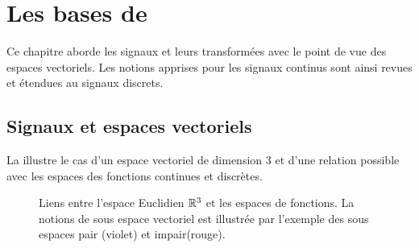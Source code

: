 \chapter{Les bases de \Fourier{}}
\label{chap:fourier}
Ce chapitre aborde les signaux et leurs transformées avec le point de
vue des espaces vectoriels. Les notions apprises pour les signaux
continus sont ainsi revues et étendues au signaux discrets.



\section{Signaux et espaces vectoriels}

La  illustre le cas d'un espace
vectoriel de dimension 3 et d'une relation possible avec les espaces
des fonctions continues et discrètes.


\begin{figure}[htbp]
  \centering
  \caption{Liens entre l'espace Euclidien $\mathbb{R}^3$ et les espaces de fonctions. La notions de sous espace vectoriel est illustrée par l'exemple des sous espaces pair (violet) et impair(rouge).}
  \label{fig:espaces_vectoriels}
\end{figure}


